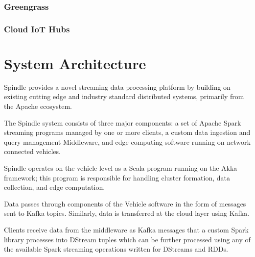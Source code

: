 \documentclass{thesis}
\begin{document}
    \subsection{Greengrass} %
    \subsection{Cloud IoT Hubs}



\chapter{System Architecture}
    Spindle provides a novel streaming data processing platform by building on
    existing cutting edge and industry standard distributed systems, primarily
    from the Apache ecosystem. 

    The Spindle system consists of three major components: a set of Apache Spark %
    streaming programs managed by one or more clients, a custom data ingestion and
    query management Middleware, and edge computing software running on network
    connected vehicles.
    
    Spindle operates on the vehicle level as a Scala
    \cite{scala} program running on the Akka \cite{akka} framework; this program
    is responsible for handling cluster formation, data collection, and edge
    computation.

    Data passes through components of the Vehicle software in the form of 
    messages sent to Kafka \cite{kafka} topics. Similarly, data is transferred
    at the cloud layer using Kafka.

    Clients receive data from the middleware as Kafka messages that a custom Spark \cite{spark}
    library processes into DStream tuples which can be further processed using any of the available
    Spark streaming operations written for DStreams and RDDs.
\end{document}
